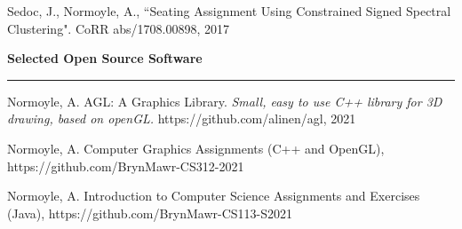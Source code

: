Sedoc, J., Normoyle, A., ``Seating Assignment Using Constrained Signed Spectral Clustering". CoRR abs/1708.00898, 2017 

\medskip
\medskip

{\Large {\bf Selected Open Source Software}}
\vspace{0.1cm}
\hrule
\medskip

Normoyle, A. AGL: A Graphics Library. \textit{Small, easy to use C++ library for 3D drawing, based on openGL.} https://github.com/alinen/agl, 2021

Normoyle, A. Computer Graphics Assignments (C++ and OpenGL), https://github.com/BrynMawr-CS312-2021

Normoyle, A. Introduction to Computer Science Assignments and Exercises (Java), https://github.com/BrynMawr-CS113-S2021

